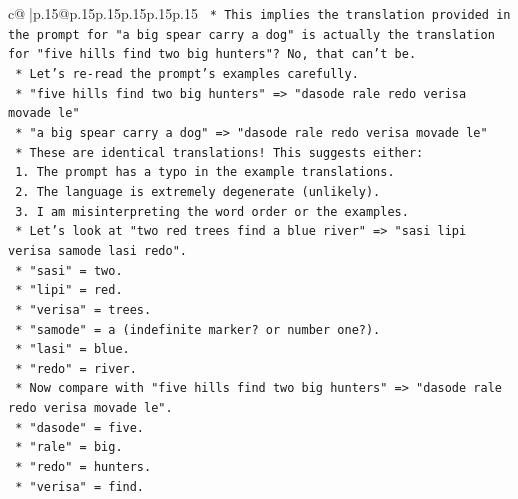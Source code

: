 \documentclass{article}
\begin{document}
{\begin{supertabular}{c@{$\;$}|p{.15\linewidth}@{}p{.15\linewidth}p{.15\linewidth}p{.15\linewidth}p{.15\linewidth}p{.15\linewidth}}
{{{\texttt{                            *   This implies the translation provided in the prompt for "a big spear carry a dog" is actually the translation for "five hills find two big hunters"? No, that can't be.} \\
\texttt{                            *   Let's re{-}read the prompt's examples carefully.} \\
\texttt{                            *   "five hills find two big hunters" => "dasode rale redo verisa movade le"} \\
\texttt{                            *   "a big spear carry a dog" => "dasode rale redo verisa movade le"} \\
\texttt{                            *   These are identical translations! This suggests either:} \\
\texttt{                                1.  The prompt has a typo in the example translations.} \\
\texttt{                                2.  The language is extremely degenerate (unlikely).} \\
\texttt{                                3.  I am misinterpreting the word order or the examples.} \\
\texttt{                            *   Let's look at "two red trees find a blue river" => "sasi lipi verisa samode lasi redo".} \\
\texttt{                                *   "sasi" = two.} \\
\texttt{                                *   "lipi" = red.} \\
\texttt{                                *   "verisa" = trees.} \\
\texttt{                                *   "samode" = a (indefinite marker? or number one?).} \\
\texttt{                                *   "lasi" = blue.} \\
\texttt{                                *   "redo" = river.} \\
\texttt{                            *   Now compare with "five hills find two big hunters" => "dasode rale redo verisa movade le".} \\
\texttt{                                *   "dasode" = five.} \\
\texttt{                                *   "rale" = big.} \\
\texttt{                                *   "redo" = hunters.} \\
\texttt{                                *   "verisa" = find.} \\
}}}
\end{supertabular}}
\end{document}
